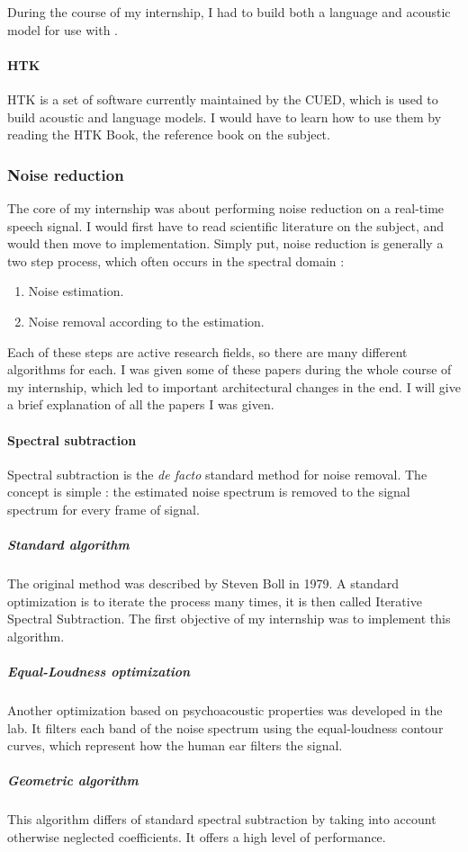 During the course of my internship, I had to build both a language and acoustic model for use with .

\paragraph{\ac{HTK}}
\ac{HTK} is a set of software currently maintained by the \ac{CUED}, which is used to build acoustic and language models. I would have to learn how to use them by reading the HTK Book, the reference book on the subject.

\subsubsection{Noise reduction}
The core of my internship was about performing noise reduction on a real-time speech signal.
I would first have to read scientific literature on the subject, and would then move to implementation.
Simply put, noise reduction is generally a two step process, which often occurs in the spectral domain : 
\begin{enumerate}
\item Noise estimation.
\item Noise removal according to the estimation.
\end{enumerate}

Each of these steps are active research fields, so there are many different algorithms for each. I was given some of these papers during the whole course of my internship, which led to important architectural changes in the end. I will give a brief explanation of all the papers I was given.
\paragraph{Spectral subtraction}
Spectral subtraction is the \textit{de facto} standard method for noise removal. The concept is simple : the estimated noise spectrum is removed to the signal spectrum for every frame of signal.

\subparagraph{Standard algorithm}
The original method was described by Steven Boll in 1979\cite{boll1979suppression}. A standard optimization is to iterate the process many times, it is then called Iterative Spectral Subtraction. The first objective of my internship was to implement this algorithm.
\subparagraph{Equal-Loudness optimization}
Another optimization based on psychoacoustic properties was developed in the lab\cite{horii2013musical}. It filters each band of the noise spectrum using the equal-loudness contour curves, which represent how the human ear filters the signal.
\subparagraph{Geometric algorithm}
This algorithm\cite{lu2008geometric} differs of standard spectral subtraction by taking into account otherwise neglected coefficients. It offers a high level of performance.
